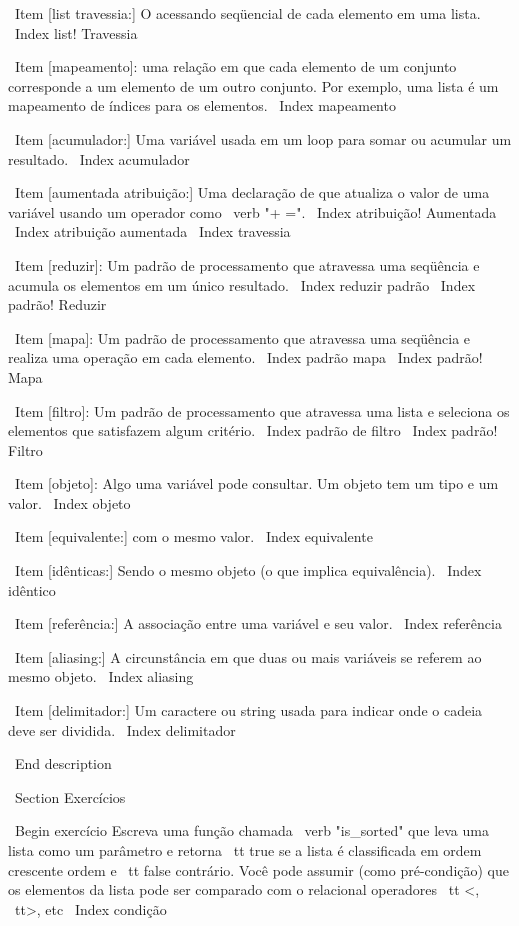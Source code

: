 \documentclass[10pt]{book}
\begin{document}
{{{{{{{\ Item [list travessia:] O acessando seqüencial de cada elemento em uma lista.
\ Index {list! Travessia}

\ Item [mapeamento]: uma relação em que cada elemento de um conjunto
corresponde a um elemento de um outro conjunto. Por exemplo, uma lista é
um mapeamento de índices para os elementos.
\ Index {mapeamento}

\ Item [acumulador:] Uma variável usada em um loop para somar ou
acumular um resultado.
\ Index {acumulador}

\ Item [aumentada atribuição:] Uma declaração de que atualiza o valor
de uma variável usando um operador como \ verb "+ =".
\ Index {atribuição! Aumentada}
\ Index {atribuição aumentada}
\ Index {travessia}

\ Item [reduzir]: Um padrão de processamento que atravessa uma seqüência 
e acumula os elementos em um único resultado.
\ Index {reduzir padrão}
\ Index {padrão! Reduzir}

\ Item [mapa]: Um padrão de processamento que atravessa uma seqüência e
realiza uma operação em cada elemento.
\ Index {padrão mapa}
\ Index {padrão! Mapa}

\ Item [filtro]: Um padrão de processamento que atravessa uma lista e
seleciona os elementos que satisfazem algum critério.
\ Index {padrão de filtro}
\ Index {padrão! Filtro}

\ Item [objeto]: Algo uma variável pode consultar. Um objeto
tem um tipo e um valor.
\ Index {objeto}

\ Item [equivalente:] com o mesmo valor.
\ Index {equivalente}

\ Item [idênticas:] Sendo o mesmo objeto (o que implica equivalência).
\ Index {idêntico}

\ Item [referência:] A associação entre uma variável e seu valor.
\ Index {referência}

\ Item [aliasing:] A circunstância em que duas ou mais variáveis ​​se referem ao mesmo
objeto.
\ Index {aliasing}

\ Item [delimitador:] Um caractere ou string usada para indicar onde o
cadeia deve ser dividida.
\ Index {delimitador}

\ End {description}


\ Section {Exercícios}

\ Begin {} exercício
Escreva uma função chamada \ verb "is_sorted" que leva uma lista como um
parâmetro e retorna {\ tt true} se a lista é classificada em ordem crescente
ordem e {\ tt false} contrário. Você pode assumir (como pré-condição)
que os elementos da lista pode ser comparado com o relacional
operadores {\ tt <}, {\ tt>}, etc
\ Index {condição}

}}}}}}}
\end{document}
